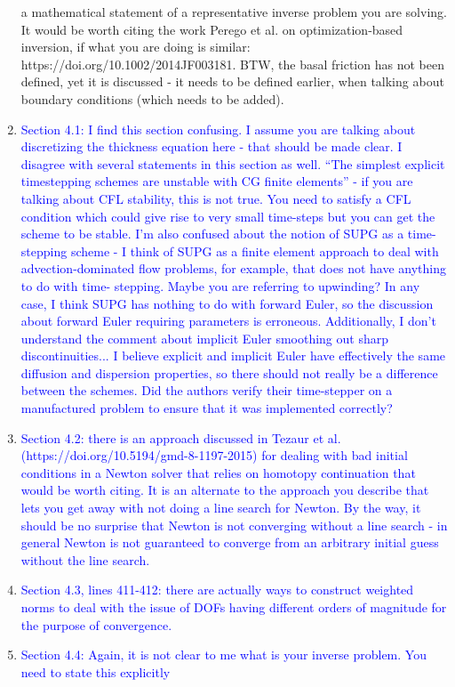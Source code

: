 \documentclass{article}
\theoremstyle{definition}
\theoremstyle{plain}
\begin{document}
\begin{enumerate}
{a mathematical statement of a representative inverse problem you are solving. It would be worth
citing the work Perego et al. on optimization-based inversion, if what you are doing is similar:
https://doi.org/10.1002/2014JF003181. BTW, the basal friction has not been defined, yet it is
discussed - it needs to be defined earlier, when talking about boundary conditions (which needs to
be added).}
\item \textcolor{blue}{Section 4.1: I find this section confusing. I assume you are talking about discretizing the thickness
equation here - that should be made clear. I disagree with several statements in this section as
well. “The simplest explicit timestepping schemes are unstable with CG finite elements” - if you are
talking about CFL stability, this is not true. You need to satisfy a CFL condition which could give
rise to very small time-steps but you can get the scheme to be stable. I’m also confused about the
notion of SUPG as a time-stepping scheme - I think of SUPG as a finite element approach to deal
with advection-dominated flow problems, for example, that does not have anything to do with time-
stepping. Maybe you are referring to upwinding? In any case, I think SUPG has nothing to do with
forward Euler, so the discussion about forward Euler requiring parameters is erroneous. Additionally,
I don’t understand the comment about implicit Euler smoothing out sharp discontinuities... I believe
explicit and implicit Euler have effectively the same diffusion and dispersion properties, so there
should not really be a difference between the schemes. Did the authors verify their time-stepper on
a manufactured problem to ensure that it was implemented correctly?}
\item \textcolor{blue}{Section 4.2: there is an approach discussed in Tezaur et al. (https://doi.org/10.5194/gmd-8-1197-2015)
for dealing with bad initial conditions in a Newton solver that relies on homotopy continuation that
would be worth citing. It is an alternate to the approach you describe that lets you get away with not
doing a line search for Newton. By the way, it should be no surprise that Newton is not converging
without a line search - in general Newton is not guaranteed to converge from an arbitrary initial
guess without the line search.}
\item \textcolor{blue}{Section 4.3, lines 411-412: there are actually ways to construct weighted norms to deal with the issue
of DOFs having different orders of magnitude for the purpose of convergence.}
\item \textcolor{blue}{Section 4.4: Again, it is not clear to me what is your inverse problem. You need to state this explicitly
}
\end{enumerate}
\end{document}
